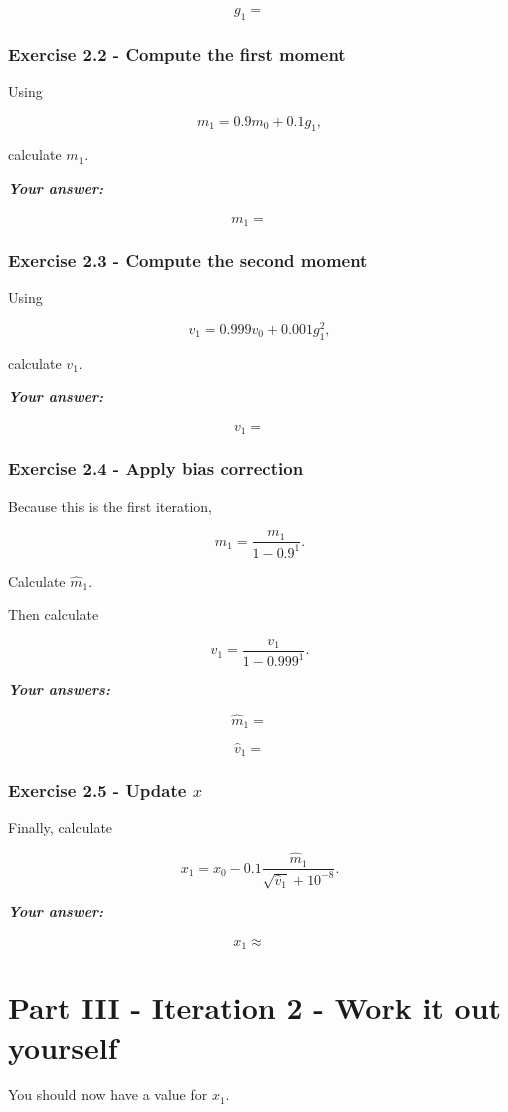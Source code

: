 \documentclass{course_sheet}
\begin{document}
\[
g_1 = {\phantom{000}}
\]

\subsubsection*{Exercise 2.2 - Compute the first moment}
Using

\[
m_1 = 0.9m_0 + 0.1g_1,
\]

calculate $m_1$.

\textbf{\textit{Your answer:}}

\[
m_1 = {\phantom{000}}
\]

\subsubsection*{Exercise 2.3 - Compute the second moment}
Using

\[
v_1 = 0.999v_0 + 0.001g_1^2,
\]

calculate $v_1$.

\textbf{\textit{Your answer:}}

\[
v_1 = {\phantom{000}}
\]

\subsubsection*{Exercise 2.4 - Apply bias correction}
Because this is the first iteration,

\[
\hat m_1 =
\frac{m_1}{1-0.9^1}.
\]

Calculate $\hat m_1$.

Then calculate

\[
\hat v_1 =
\frac{v_1}{1-0.999^1}.
\]

\textbf{\textit{Your answers:}}

\[
\hat m_1 = {\phantom{000}}
\]

\[
\hat v_1 = {\phantom{000}}
\]

\subsubsection*{Exercise 2.5 - Update $x$}
Finally, calculate

\[
x_1 =
x_0 -
0.1
\frac{\hat m_1}
{\sqrt{\hat v_1}+10^{-8}}.
\]

\textbf{\textit{Your answer:}}

\[
x_1 \approx {\phantom{000}}
\]

\clearpage
\section*{Part III - Iteration 2 - Work it out yourself}
You should now have a value for $x_1$.
\end{document}
